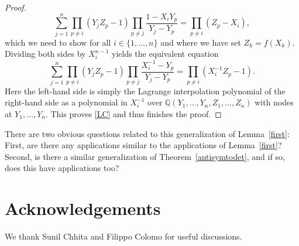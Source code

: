 \documentclass[12pt,dvipsnames]{amsart}
\theoremstyle{definition}
\begin{document}
\begin{proof}
\begin{equation*}
	\sum_{j=1}^n\prod_{p\neq i}(Y_jZ_p-1)\prod_{p\neq j}\frac{1-X_iY_p}{Y_j-Y_p}=\prod_{p\neq i}(Z_p-X_i),
\end{equation*} which we need to show for all $i\in\{1,\ldots,n\}$ and where we have set $Z_k=f(X_k)$.
Dividing both sides by $X_i^{n-1}$ yields the equivalent equation 
\begin{equation*}
	\sum_{j=1}^n\prod_{p\neq i}(Y_jZ_p-1)\prod_{p\neq j}\frac{X_i^{-1}-Y_p}{Y_j-Y_p}=\prod_{p\neq i}(X_i^{-1}Z_p-1).
\end{equation*} Here the left-hand side is simply the Lagrange interpolation polynomial of the right-hand side as a polynomial in $X_i^{-1}$ over $\mathbb{Q}(Y_1,\dots,Y_n,Z_1,\dots,Z_n)$ with nodes at $Y_1,\dots,Y_n$. This proves \eqref{LC} and thus finishes the proof.

\end{proof}  



There are two obvious questions related to this generalization of Lemma~\ref{first}: First, are there any applications similar to the applications of Lemma~\ref{first}? Second, is there a similar generalization of Theorem~\ref{antisymtodet}, and if so, does this have applications too? 

\section{Acknowledgements} 

We thank Sunil Chhita and Filippo Colomo for useful discussions.





\end{document}
